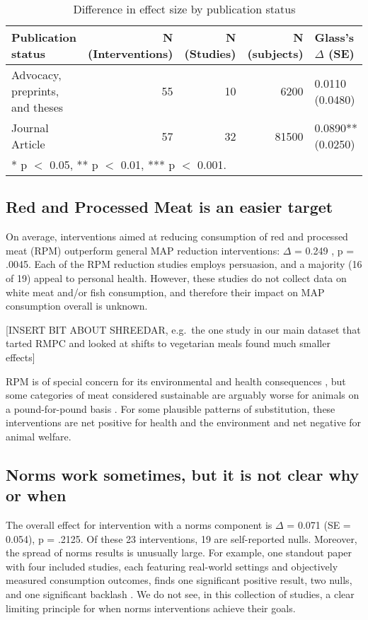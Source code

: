 \documentclass[sn-nature,pdflatex]{sn-jnl}
\begin{document}
\begin{table}[!h]
\centering
\caption{\label{tab:table_three}Difference in effect size by publication status}
\centering
\begin{tabular}[t]{lrrrl}
\toprule
Publication status & N (Interventions) & N (Studies) & N (subjects) & Glass's $\Delta$ (SE)\\
\midrule
Advocacy, preprints, and theses & 55 & 10 & 6200 & 0.0110 (0.0480)\\
Journal Article & 57 & 32 & 81500 & 0.0890** (0.0250)\\
\bottomrule
\multicolumn{5}{l}{\rule{0pt}{1em}* p $<$ 0.05, ** p $<$ 0.01, *** p $<$ 0.001.}\\
\end{tabular}
\end{table}

\subsection{Red and Processed Meat is an easier target}\label{sec2.3}

On average, interventions aimed at reducing consumption of red and
processed meat (RPM) outperform general MAP reduction interventions:
\(\Delta\) = 0.249 , p = .0045. Each of the RPM
reduction studies employs persuasion, and a majority (16 of 19) appeal
to personal health. However, these studies do not collect data on white
meat and/or fish consumption, and therefore their impact on MAP
consumption overall is unknown.

{[}INSERT BIT ABOUT SHREEDAR, e.g.~the one study in our main dataset
that tarted RMPC and looked at shifts to vegetarian meals found much
smaller effects{]}

RPM is of special concern for its environmental and health consequences
\citep{grummon2023}, but some categories of meat considered sustainable
are arguably worse for animals on a pound-for-pound basis
\citep{mathur2022ethical}. For some plausible patterns of substitution,
these interventions are net positive for health and the environment and
net negative for animal welfare.

\subsection{Norms work sometimes, but it is not clear why or
when}\label{sec2.4}

The overall effect for intervention with a norms component is \(\Delta\)
= 0.071 (SE = 0.054), p = .2125. Of these 23 interventions, 19 are
self-reported nulls. Moreover, the spread of norms results is unusually
large. For example, one standout paper with four included studies, each
featuring real-world settings and objectively measured consumption
outcomes, finds one significant positive result, two nulls, and one
significant backlash \citep{sparkman2020}. We do not see, in this
collection of studies, a clear limiting principle for when norms
interventions achieve their goals.
\end{document}
